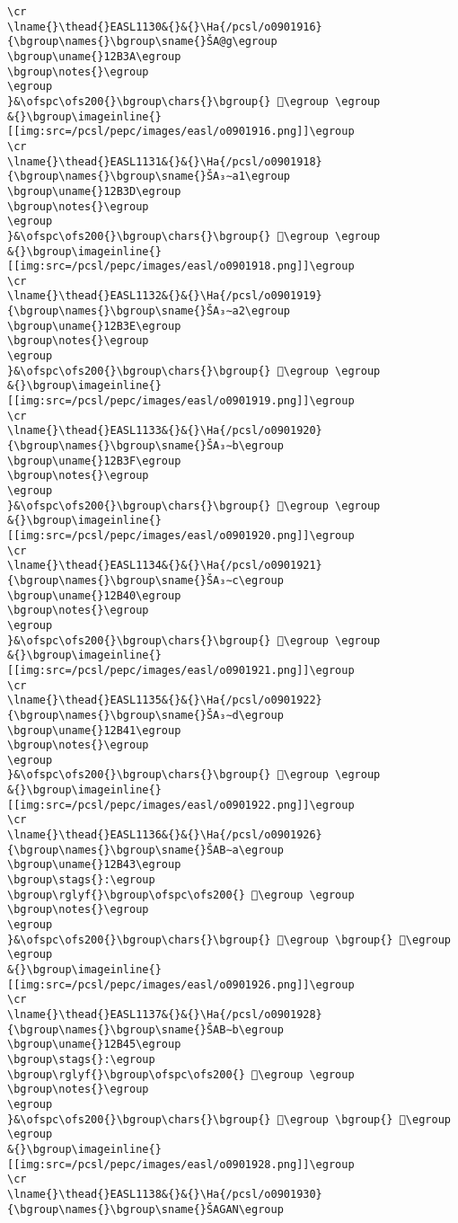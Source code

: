 \begin{verbatim}
\cr
\lname{}\thead{}EASL1130&{}&{}\Ha{/pcsl/o0901916}{\bgroup\names{}\bgroup\sname{}ŠA@g\egroup
\bgroup\uname{}12B3A\egroup
\bgroup\notes{}\egroup
\egroup
}&\ofspc\ofs200{}\bgroup\chars{}\bgroup{} 𒬺\egroup \egroup
&{}\bgroup\imageinline{}[[img:src=/pcsl/pepc/images/easl/o0901916.png]]\egroup
\cr
\lname{}\thead{}EASL1131&{}&{}\Ha{/pcsl/o0901918}{\bgroup\names{}\bgroup\sname{}ŠA₃∼a1\egroup
\bgroup\uname{}12B3D\egroup
\bgroup\notes{}\egroup
\egroup
}&\ofspc\ofs200{}\bgroup\chars{}\bgroup{} 𒬽\egroup \egroup
&{}\bgroup\imageinline{}[[img:src=/pcsl/pepc/images/easl/o0901918.png]]\egroup
\cr
\lname{}\thead{}EASL1132&{}&{}\Ha{/pcsl/o0901919}{\bgroup\names{}\bgroup\sname{}ŠA₃∼a2\egroup
\bgroup\uname{}12B3E\egroup
\bgroup\notes{}\egroup
\egroup
}&\ofspc\ofs200{}\bgroup\chars{}\bgroup{} 𒬾\egroup \egroup
&{}\bgroup\imageinline{}[[img:src=/pcsl/pepc/images/easl/o0901919.png]]\egroup
\cr
\lname{}\thead{}EASL1133&{}&{}\Ha{/pcsl/o0901920}{\bgroup\names{}\bgroup\sname{}ŠA₃∼b\egroup
\bgroup\uname{}12B3F\egroup
\bgroup\notes{}\egroup
\egroup
}&\ofspc\ofs200{}\bgroup\chars{}\bgroup{} 𒬿\egroup \egroup
&{}\bgroup\imageinline{}[[img:src=/pcsl/pepc/images/easl/o0901920.png]]\egroup
\cr
\lname{}\thead{}EASL1134&{}&{}\Ha{/pcsl/o0901921}{\bgroup\names{}\bgroup\sname{}ŠA₃∼c\egroup
\bgroup\uname{}12B40\egroup
\bgroup\notes{}\egroup
\egroup
}&\ofspc\ofs200{}\bgroup\chars{}\bgroup{} 𒭀\egroup \egroup
&{}\bgroup\imageinline{}[[img:src=/pcsl/pepc/images/easl/o0901921.png]]\egroup
\cr
\lname{}\thead{}EASL1135&{}&{}\Ha{/pcsl/o0901922}{\bgroup\names{}\bgroup\sname{}ŠA₃∼d\egroup
\bgroup\uname{}12B41\egroup
\bgroup\notes{}\egroup
\egroup
}&\ofspc\ofs200{}\bgroup\chars{}\bgroup{} 𒭁\egroup \egroup
&{}\bgroup\imageinline{}[[img:src=/pcsl/pepc/images/easl/o0901922.png]]\egroup
\cr
\lname{}\thead{}EASL1136&{}&{}\Ha{/pcsl/o0901926}{\bgroup\names{}\bgroup\sname{}ŠAB∼a\egroup
\bgroup\uname{}12B43\egroup
\bgroup\stags{}:\egroup
\bgroup\rglyf{}\bgroup\ofspc\ofs200{} 𒭃\egroup \egroup
\bgroup\notes{}\egroup
\egroup
}&\ofspc\ofs200{}\bgroup\chars{}\bgroup{} 𒭂\egroup \bgroup{} 𒭃\egroup \egroup
&{}\bgroup\imageinline{}[[img:src=/pcsl/pepc/images/easl/o0901926.png]]\egroup
\cr
\lname{}\thead{}EASL1137&{}&{}\Ha{/pcsl/o0901928}{\bgroup\names{}\bgroup\sname{}ŠAB∼b\egroup
\bgroup\uname{}12B45\egroup
\bgroup\stags{}:\egroup
\bgroup\rglyf{}\bgroup\ofspc\ofs200{} 𒭅\egroup \egroup
\bgroup\notes{}\egroup
\egroup
}&\ofspc\ofs200{}\bgroup\chars{}\bgroup{} 𒭄\egroup \bgroup{} 𒭅\egroup \egroup
&{}\bgroup\imageinline{}[[img:src=/pcsl/pepc/images/easl/o0901928.png]]\egroup
\cr
\lname{}\thead{}EASL1138&{}&{}\Ha{/pcsl/o0901930}{\bgroup\names{}\bgroup\sname{}ŠAGAN\egroup

\end{verbatim}
